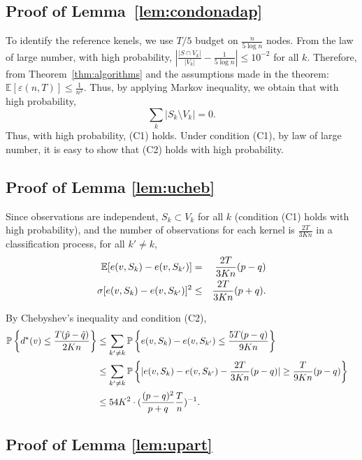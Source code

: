 \subsection{Proof of Lemma~\ref{lem:condonadap}}
To identify the reference kenels, we use $T/5$ budget on
$\frac{n}{5\log n}$ nodes. From the law of large number, with high probability, $\left| \frac{|S\cap V_k|}{|V_k|}
  -\frac{1}{5 \log n} \right| \le 10^{-2}$ for all $k$.
Therefore, from Theorem~\ref{thm:algorithms} and the assumptions made in the theorem: $\mathbb{E}[\varepsilon(n,T)] \le \frac{1}{n^2}$. Thus, by applying Markov inequality, we obtain that with high probability, 
$$\sum_{k}  | S_k \setminus V_k | =0.$$
Thus, with high probability, (C1) holds. Under condition (C1), by law of large number, it is easy to show
that (C2) holds with high probability.


\subsection{Proof of Lemma \ref{lem:ucheb}}

Since observations are independent, $S_k \subset V_k$ for all
$k$ (condition (C1) holds with high probability), and the number of
observations for each kernel is $\frac{2T}{3Kn}$ in a classification
process, for all $k' \neq k$,
\begin{eqnarray*}
{\mathbb E} [e(v,S_k)-e(v,S_{k'})]& = & \frac{2T}{3Kn}(p-q)\cr
\sigma[e(v,S_{k})-e(v,S_{k'})]^2& \le & \frac{2T}{3Kn}(p +q).
\end{eqnarray*}

By Chebyshev's inequality and condition (C2),
\begin{align*}
\mathbb{P}\left\{ d^{\star}(v)  \le  \frac{T (\hat{p}-\hat{q})}{2Kn} \right\}
&\le\sum_{k' \neq k} \mathbb{P} \left\{ e(v,S_k)-e(v,S_{k'})  \le  \frac{5T (p-q)}{9Kn} \right\} \cr
& \le\sum_{k' \neq k} \mathbb{P}\left\{ |e(v,S_k)-e(v,S_{k'})-\frac{2T}{3Kn}(p-q)| \ge \frac{T}{9Kn}(p-q)  \right\} \cr
& \le 54K^2 \cdot
(\frac{(p-q)^2}{p+q}\frac{T}{n})^{-1}.
\end{align*}


\subsection{Proof of Lemma \ref{lem:upart}}

